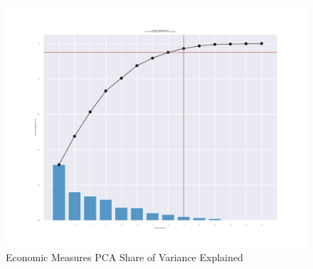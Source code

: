 \documentclass[12pt]{article}
\begin{document}
        \begin{figure}[h!]
            \centering
            \caption{Economic Measures PCA Share of Variance Explained}
            \label{Econ_Share_Explained}	
            \includegraphics[width=\linewidth,keepaspectratio=true]{../Output/Figures/Econ_Indicator_Share_Explained_combined.pdf}
        \end{figure}
\end{document}
